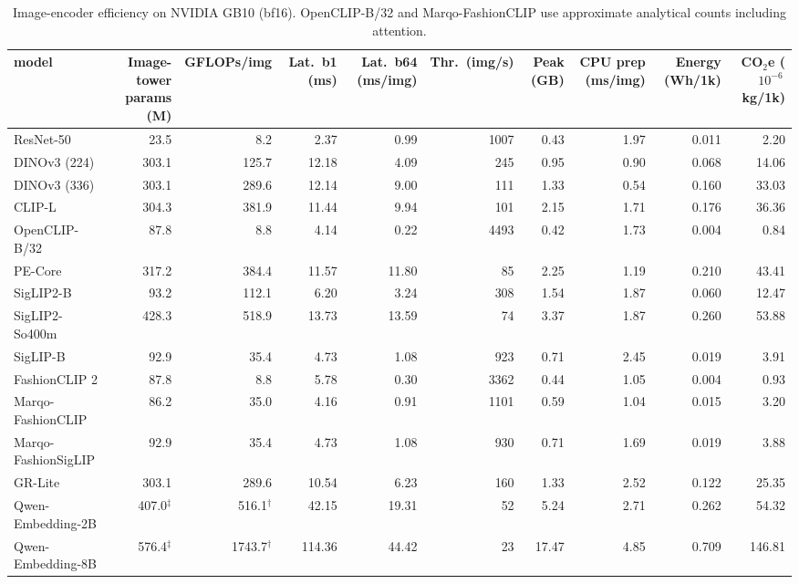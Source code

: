 \begin{table}[!h]\centering\small
\caption{Image-encoder efficiency on NVIDIA GB10 (bf16). OpenCLIP-B/32 and Marqo-FashionCLIP use approximate analytical counts including attention.}\label{tab:v2-efficiency}
\begin{tabular}{lrrrrrrrrr}\toprule
model & Image-tower params (M) & GFLOPs/img & Lat.\ b1 (ms) & Lat.\ b64 (ms/img) & Thr.\ (img/s) & Peak (GB) & CPU prep (ms/img) & Energy (Wh/1k) & CO$_2$e ($10^{-6}$\,kg/1k) \\\midrule
ResNet-50 & 23.5 & 8.2 & 2.37 & 0.99 & 1007 & 0.43 & 1.97 & 0.011 & 2.20 \\
DINOv3 (224) & 303.1 & 125.7 & 12.18 & 4.09 & 245 & 0.95 & 0.90 & 0.068 & 14.06 \\
DINOv3 (336) & 303.1 & 289.6 & 12.14 & 9.00 & 111 & 1.33 & 0.54 & 0.160 & 33.03 \\
CLIP-L & 304.3 & 381.9 & 11.44 & 9.94 & 101 & 2.15 & 1.71 & 0.176 & 36.36 \\
OpenCLIP-B/32 & 87.8 & 8.8 & 4.14 & 0.22 & 4493 & 0.42 & 1.73 & 0.004 & 0.84 \\
PE-Core & 317.2 & 384.4 & 11.57 & 11.80 & 85 & 2.25 & 1.19 & 0.210 & 43.41 \\
SigLIP2-B & 93.2 & 112.1 & 6.20 & 3.24 & 308 & 1.54 & 1.87 & 0.060 & 12.47 \\
SigLIP2-So400m & 428.3 & 518.9 & 13.73 & 13.59 & 74 & 3.37 & 1.87 & 0.260 & 53.88 \\
SigLIP-B & 92.9 & 35.4 & 4.73 & 1.08 & 923 & 0.71 & 2.45 & 0.019 & 3.91 \\
FashionCLIP 2 & 87.8 & 8.8 & 5.78 & 0.30 & 3362 & 0.44 & 1.05 & 0.004 & 0.93 \\
Marqo-FashionCLIP & 86.2 & 35.0 & 4.16 & 0.91 & 1101 & 0.59 & 1.04 & 0.015 & 3.20 \\
Marqo-FashionSigLIP & 92.9 & 35.4 & 4.73 & 1.08 & 930 & 0.71 & 1.69 & 0.019 & 3.88 \\
GR-Lite & 303.1 & 289.6 & 10.54 & 6.23 & 160 & 1.33 & 2.52 & 0.122 & 25.35 \\
Qwen-Embedding-2B & 407.0$^\ddagger$ & 516.1$^\dagger$ & 42.15 & 19.31 & 52 & 5.24 & 2.71 & 0.262 & 54.32 \\
Qwen-Embedding-8B & 576.4$^\ddagger$ & 1743.7$^\dagger$ & 114.36 & 44.42 & 23 & 17.47 & 4.85 & 0.709 & 146.81 \\
\bottomrule\end{tabular}
\par{}
\end{table}
